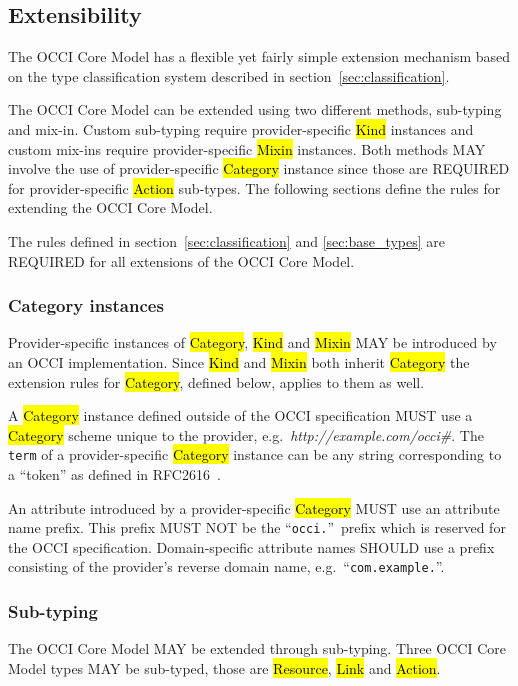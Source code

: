 \documentclass[10pt,a4paper]{article}
\begin{document}
\subsection{Extensibility}
\label{sec:extensibility}
The OCCI Core Model has a flexible yet fairly simple extension
mechanism based on the type classification system described in
section~\ref{sec:classification}.

The OCCI Core Model can be extended using two different methods,
sub-typing and mix-in. Custom sub-typing require provider-specific
\hl{Kind} instances and custom mix-ins require provider-specific
\hl{Mixin} instances.  Both methods MAY involve the use of
provider-specific \hl{Category} instance since those are REQUIRED for
provider-specific \hl{Action} sub-types.  The following sections
define the rules for extending the OCCI Core Model.

The rules defined in section~\ref{sec:classification} and
\ref{sec:base_types} are REQUIRED for all extensions of the OCCI Core
Model.

\subsubsection{Category instances}
\label{sec:ext:category}
Provider-specific instances of \hl{Category}, \hl{Kind} and \hl{Mixin}
MAY be introduced by an OCCI implementation. Since \hl{Kind} and
\hl{Mixin} both inherit \hl{Category} the extension rules for
\hl{Category}, defined below, applies to them as well.

A \hl{Category} instance defined outside of the OCCI specification
MUST use a \hl{Category} scheme unique to the provider,
e.g.~\textit{http://example.com/occi\#}. The {\tt term} of a
provider-specific \hl{Category} instance can be any string
corresponding to a ``token'' as defined in RFC2616~\cite{rfc2616}.

An attribute introduced by a provider-specific \hl{Category} MUST use
an attribute name prefix. This prefix MUST NOT be the
``\texttt{occi.}''~prefix which is reserved for the OCCI
specification. Domain-specific attribute names SHOULD use a prefix
consisting of the provider's reverse domain name,
e.g.~``\texttt{com.example.}''.

\subsubsection{Sub-typing}
The OCCI Core Model MAY be extended through sub-typing.  Three OCCI
Core Model types MAY be sub-typed, those are \hl{Resource}, \hl{Link}
and \hl{Action}.
\end{document}

